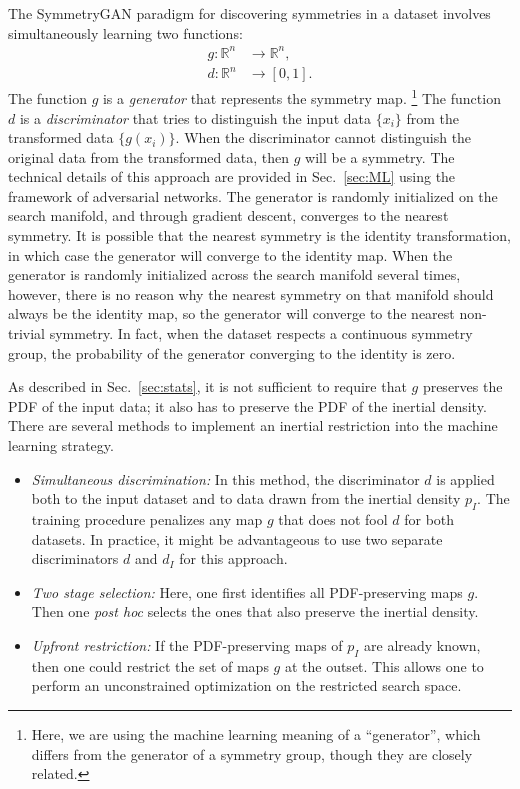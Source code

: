 \documentclass[aps,prx,reprint,preprintnumbers,superscriptaddress,nofootinbib,longbibliography,floatfix]{revtex4-1}
\DeclareRobustCommand{\Sec}[1]{Sec.~\ref{sec:#1}}
\begin{document}
The SymmetryGAN paradigm for discovering symmetries in a dataset involves simultaneously learning two functions:
%
\begin{align}
    g:\mathbb{R}^n &\rightarrow\mathbb{R}^n,\\
    d:\mathbb{R}^n &\rightarrow[0,1].
\end{align}
%
The function $g$ is a \emph{generator} that represents the symmetry map.%
%
\footnote{Here, we are using the machine learning meaning of a ``generator'', which differs from the generator of a symmetry group, though they are closely related.}
%
The function $d$ is a \emph{discriminator} that tries to distinguish the input data $\{x_i\}$ from the transformed data $\{g(x_i)\}$.
%
When the discriminator cannot distinguish the original data from the transformed data, then $g$ will be a symmetry.
%
The technical details of this approach are provided in \Sec{ML} using the framework of adversarial networks.
%
The generator is randomly initialized on the search manifold, and through gradient descent, converges to the nearest symmetry.
%
It is possible that the nearest symmetry is the identity transformation, in which case the generator will converge to the identity map.
%
When the generator is randomly initialized across the search manifold several times, however, there is no reason why the nearest symmetry on that manifold should always be the identity map, so the generator will converge to the nearest non-trivial symmetry.
%
In fact, when the dataset respects a continuous symmetry group, the probability of the generator converging to the identity is zero.


As described in \Sec{stats}, it is not sufficient to require that $g$ preserves the PDF of the input data; it also has to preserve the PDF of the inertial density.
%
There are several methods to implement an inertial restriction into the machine learning strategy.
%
\begin{itemize}
    \item \emph{Simultaneous discrimination:}
    In this method, the discriminator $d$ is applied both to the input dataset and to data drawn from the inertial density $p_I$.
    The training procedure penalizes any map $g$ that does not fool $d$ for both datasets.
    In practice, it might be advantageous to use two separate discriminators $d$ and $d_I$ for this approach.
    \item \emph{Two stage selection:}
    Here, one first identifies all PDF-preserving maps $g$.
    Then one \textit{post hoc} selects the ones that also preserve the inertial density.
    \item \emph{Upfront restriction:}
    If the PDF-preserving maps of $p_I$ are already known, then one could restrict the set of maps $g$ at the outset.
    This allows one to perform an unconstrained optimization on the restricted search space.
\end{itemize}
\end{document}
